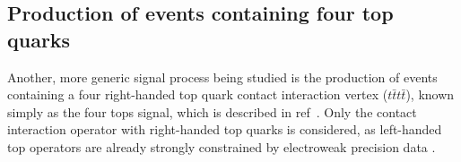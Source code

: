 
\subsection{Production of events containing four top quarks}

Another, more generic signal process being studied is the production of events containing a four right-handed top quark contact interaction vertex ($t\bar{t}t\bar{t}$), known simply as the four tops signal, which is described in ref~\cite{Degrande:2010ds}.
Only the contact interaction operator with right-handed top quarks is considered, as left-handed top operators are already strongly constrained by electroweak precision data \cite{PhysRevD.51.3888}.

